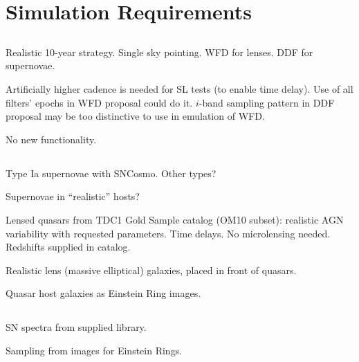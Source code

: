 \section{Simulation Requirements}
\def\secname{\chpname:simulations}
\label{\secname}



\subsection{\OpSim}

Realistic 10-year strategy. Single sky pointing.
WFD for lenses. DDF for supernovae.

Artificially higher cadence is needed for SL tests (to enable time
delay).  Use of all filters' epochs in WFD proposal could do it.
$i$-band sampling pattern in DDF proposal may be too distinctive to
use in emulation of WFD.


No new functionality.


\subsection{\CatSim}

Type Ia supernovae with SNCosmo. Other types?

Supernovae in ``realistic'' hosts?

Lensed quasars from TDC1 Gold Sample catalog (OM10 subset):
realistic AGN variability with requested parameters. Time delays.
No microlensing needed. Redshifts supplied in catalog.

Realistic lens (massive elliptical) galaxies, placed in front of quasars.

Quasar host galaxies as Einstein Ring images.



\subsection{\PhoSim}

SN spectra from supplied library.

Sampling from images for Einstein Rings.


